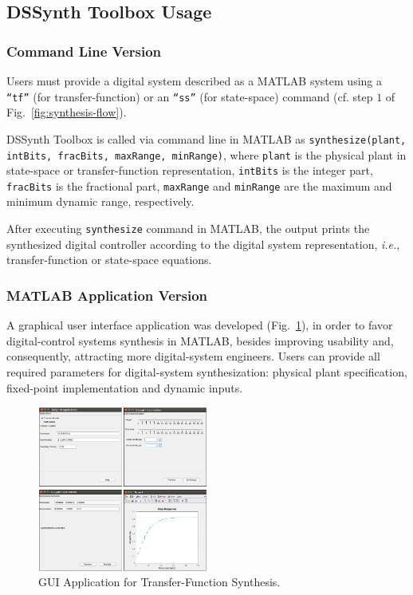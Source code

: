 \documentclass[sigconf]{acmart}
\newcommand\tool{{DSSynth Toolbox}\xspace}
\begin{document}
\subsection{\tool Usage}

\subsubsection{Command Line Version}

Users must provide a digital system described as a MATLAB system  using a \texttt{``tf''} (for transfer-function) or an \texttt{``ss''} (for state-space) command (cf. step $1$ of Fig.~\ref{fig:synthesis-flow}).

\tool is called via command line in MATLAB as \texttt{synthesize(plant, intBits, fracBits, maxRange, minRange)}, where \texttt{plant} is the physical plant in state-space or transfer-function representation, \texttt{intBits} is the integer part, \texttt{fracBits} is the fractional part, \texttt{maxRange} and \texttt{minRange} are the maximum and minimum dynamic range, respectively.

After executing \texttt{synthesize} command in MATLAB, the output prints the synthesized digital controller according to the digital system representation, {\it i.e.}, transfer-function or state-space equations. 

\subsubsection{MATLAB Application Version} 

A graphical user interface application was developed (Fig.~\ref{fig:gui-for-tf}), in order to favor digital-control systems synthesis in MATLAB, besides improving usability and, consequently, attracting more digital-system engineers. Users can provide all required parameters for digital-system synthesization: physical plant specification, fixed-point implementation and dynamic inputs. 
%
\begin{figure}
  \includegraphics[width=0.5\textwidth]{screens_dssynth.png}
  \caption{GUI Application for Transfer-Function Synthesis.}
  \label{fig:gui-for-tf}
\end{figure}
\end{document}
